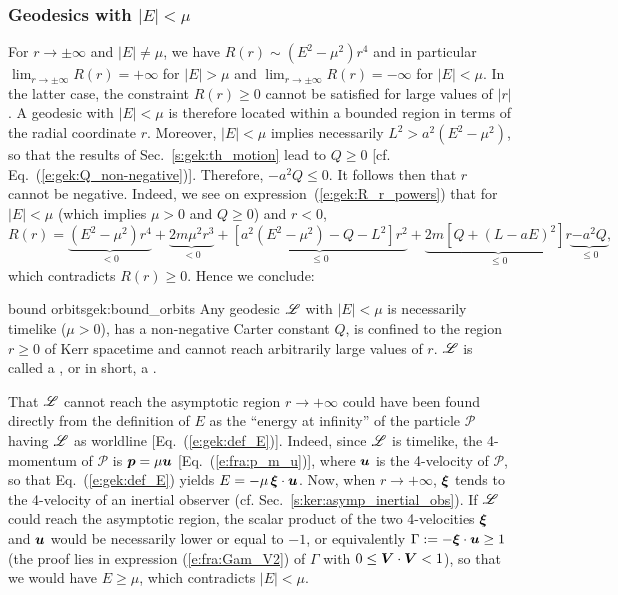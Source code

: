 \subsubsection{Geodesics with $|E|<\mu$} \label{s:gek:bound_geod}

For $r\to \pm\infty$ and $|E|\neq \mu$,
we have $R(r) \sim (E^2 - \mu^2) r^4$ and in
particular $\lim_{r\to\pm\infty} R(r) = + \infty$ for $|E|>\mu$
and $\lim_{r\to\pm\infty} R(r) = - \infty$ for $|E|<\mu$. In the latter case,
the constraint $R(r) \geq 0$ cannot be satisfied for large values
of $|r|$. A geodesic with $|E|<\mu$ is therefore located within a bounded
region in terms of the radial coordinate $r$. Moreover, $|E|<\mu$
implies necessarily $L^2 > a^2 (E^2 - \mu^2)$, so that
the results of
Sec.~\ref{s:gek:th_motion} lead to $Q\geq 0$
[cf. Eq.~(\ref{e:gek:Q_non-negative})]. Therefore, $-a^2 Q \leq 0$.
It follows then that $r$ cannot be negative.
Indeed, we see
on expression~(\ref{e:gek:R_r_powers}) that for $|E|<\mu$ (which implies $\mu>0$ and $Q\geq 0$) and $r<0$,
\[
    R(r) = \underbrace{(E^2 - \mu^2) r^4}_{<0} + \underbrace{2 m \mu^2 r^3}_{<0}
     + \underbrace{\left[ a^2 (E^2 - \mu^2) - Q - L^2 \right] r^2}_{\leq 0}
     + \underbrace{2m\left[ Q + (L - a E)^2 \right] r}_{\leq 0}
     \underbrace{-a^2 Q}_{\leq 0} ,
\]
which contradicts $R(r)\geq 0$.
Hence we conclude:

\begin{tprop}{bound orbits}{gek:bound_orbits}
Any geodesic $\mathscr{L}$ with $|E|<\mu$ is necessarily timelike ($\mu >0$),
has a non-negative Carter constant $Q$,
is confined to the region $r\geq 0$ of Kerr spacetime
and cannot reach arbitrarily large values of $r$. $\mathscr{L}$ is called a
,
or in short, a .
\end{tprop}

\begin{remark} \label{r:gek:bound_geod}
That $\mathscr{L}$
cannot reach the asymptotic region $r\to +\infty$ could have been
found directly from the definition of $E$ as the ``energy at infinity''
of the particle $\mathscr{P}$ having $\mathscr{L}$ as worldline
[Eq.~(\ref{e:gek:def_E})]. Indeed, since $\mathscr{L}$ is timelike, the 4-momentum
of $\mathscr{P}$ is $\bm{p} = \mu \bm{u}$ [Eq.~(\ref{e:fra:p_m_u})], where
$\bm{u}$ is the 4-velocity of $\mathscr{P}$, so that Eq.~(\ref{e:gek:def_E})
yields $E = - \mu\, \bm{\xi}\cdot\bm{u}$. Now, when $r\to +\infty$, $\bm{\xi}$
tends to the 4-velocity of an inertial observer (cf. Sec.~\ref{s:ker:asymp_inertial_obs}).
If $\mathscr{L}$ could reach the asymptotic region,
the scalar
product of the two 4-velocities $\bm{\xi}$ and
$\bm{u}$ would be necessarily lower or equal to $-1$, or equivalently
$\Gamma := - \bm{\xi}\cdot\bm{u} \geq 1$ (the proof lies in expression
(\ref{e:fra:Gam_V2}) of $\Gamma$ with $0\leq \bm{V}\cdot\bm{V} < 1$), so that
we would have $E \geq \mu$, which contradicts $|E|<\mu$.
\end{remark}

